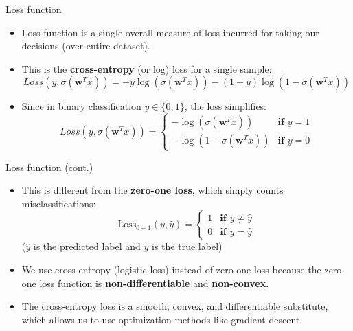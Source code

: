 \documentclass[serif, aspectratio=169]{beamer}
\begin{document}

\begin{frame}{Loss function}
    \begin{itemize}
        \item Loss function is a single overall measure of loss incurred for taking our decisions (over entire dataset).
        \item This is the \textbf{cross-entropy} (or log) loss for a single sample:
        \[ Loss(y, \sigma (\mathbf{w}^T x)) = -y \log (\sigma ( \mathbf{w}^T x)) - (1-y) \log 
        (1 - \sigma (\mathbf{w}^T x))
        \]
        
        \item Since in binary classification $y \in \{0, 1\}$, the loss simplifies:
            \[
                Loss(y, \sigma (\mathbf{w}^T x)) = \begin{cases}
                    - \log (\sigma (\mathbf{w}^T x)) & \textbf{if } y = 1 \\
                    - \log (1 - \sigma (\mathbf{w}^T x)) & \textbf{if } y = 0
                \end{cases}
            \]
    \end{itemize}
\end{frame}
\begin{frame}{Loss function (cont.)}
    \begin{itemize}
        \item This is different from the \textbf{zero-one loss}, which simply counts misclassifications:
           \[
               \text{Loss}_{0-1}(y, \hat{y}) =  \begin{cases}
                    1 & \textbf{if } y \neq \hat{y} \\
                    0 & \textbf{if } y = \hat{y}
                \end{cases}
            \]
            ($\hat{y}$ is the predicted label and $y$ is the true label)
            
        \item We use cross-entropy (logistic loss) instead of zero-one loss because the zero-one loss function is \textbf{non-differentiable} and \textbf{non-convex}. 
        
        \item The cross-entropy loss is a smooth, convex, and differentiable substitute, which allows us to use optimization methods like gradient descent.
    \end{itemize}
\end{frame}
\end{document}
